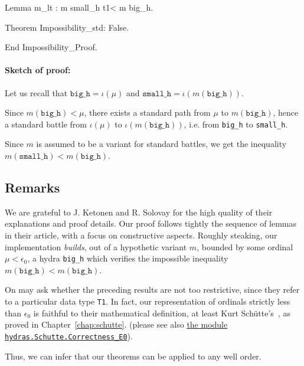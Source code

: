 \begin{Coqsrc}
  Lemma m_lt : m small_h  t1< m big_h.

  Theorem Impossibility_std: False.

End Impossibility_Proof.
\end{Coqsrc}




\paragraph*{Sketch of proof:} Let us recall that $\texttt{big\_h} = \iota(\mu)$
 and $\texttt{small\_h} = \iota (m (\texttt{big\_h}))$.

Since $m(\texttt{big\_h})< \mu$, there exists a standard path from $\mu$ to
$m(\texttt{big\_h})$, hence a   standard battle from $\iota(\mu)$  to
$\iota(m(\texttt{big\_h}))$,  i.e. from \texttt{big\_h} to \texttt{small\_h}.

Since $m$ is assumed to be a variant for standard battles, we get the inequality  $m(\texttt{small\_h}) < m(\texttt{big\_h})$.





\subsection{Remarks}

We are grateful to 
 J. Ketonen and R. Solovay  for the high quality of their explanations and proof details.
Our proof follows tightly the sequence of lemmas in their article, with a focus on 
constructive aspects.
Roughly steaking, our implementation \emph{builds}, out of a hypothetic 
  variant $m$, bounded by some ordinal $\mu<\epsilon_0$, a hydra \texttt{big\_h} which verifies the impossible inequality  $m(\texttt{big\_h})< m(\texttt{big\_h})$.



On may ask whether the preceding results are not too restrictive, since they 
refer to a particular data type \texttt{T1}.
In fact, our representation of ordinals strictly less than 
 $\epsilon_0$ is faithful to their mathematical definition, at least 
Kurt Schütte's~\cite{schutte}, as proved in Chapter~\vref{chap:schutte}.
(please see also \href{../theories/html/hydras.Schutte.Correctness_E0.html}{the module \texttt{hydras.Schutte.Correctness\_E0}}).

Thus, we can infer that our theorems can be applied to any well order.


